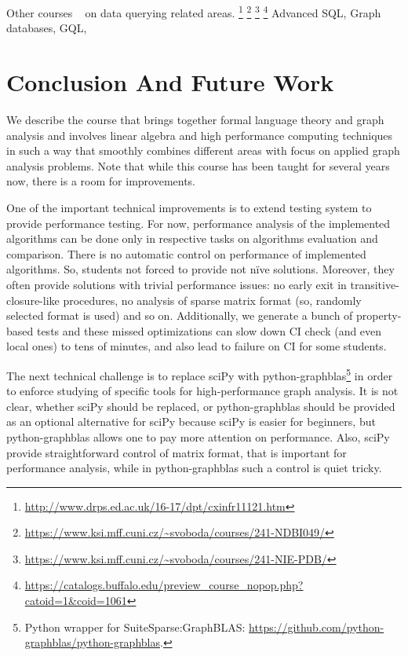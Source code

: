 \documentclass[sigconf]{acmart}
\begin{document}
Other courses ~\cite{Figueira2022} on data querying related areas.
\footnote{\url{http://www.drps.ed.ac.uk/16-17/dpt/cxinfr11121.htm}}
\footnote{\url{https://www.ksi.mff.cuni.cz/~svoboda/courses/241-NDBI049/}}
\footnote{\url{https://www.ksi.mff.cuni.cz/~svoboda/courses/241-NIE-PDB/}}
\footnote{\url{https://catalogs.buffalo.edu/preview_course_nopop.php?catoid=1&coid=1061}}
Advanced SQL, Graph databases, GQL, 

\section{Conclusion And Future Work}

We describe the course that brings together formal language theory and graph analysis and involves linear algebra and high performance computing techniques in such a way that smoothly combines different areas with focus on applied graph analysis problems. 
Note that while this course has been taught for several years now, there is a room for improvements.

One of the important technical improvements is to extend testing system to provide performance testing. 
For now, performance analysis of the implemented algorithms can be done only in respective tasks on algorithms evaluation and comparison.
There is no automatic control on performance of implemented algorithms. 
So, students not forced to provide not n\"ive solutions.
Moreover, they often provide solutions with trivial performance issues: no early exit in transitive-closure-like procedures, no analysis of sparse matrix format (so, randomly selected format is used) and so on.
Additionally, we generate a bunch of property-based tests and these missed optimizations can slow down CI check (and even local ones) to tens of minutes, and also lead to failure on CI for some students.

The next technical challenge is to replace sciPy with python-graphblas\footnote{Python wrapper for SuiteSparse:GraphBLAS: \url{https://github.com/python-graphblas/python-graphblas}.} in order to enforce studying of specific tools for high-performance graph analysis. 
It is not clear, whether sciPy should be replaced, or python-graphblas should be provided as an optional alternative for sciPy because sciPy is easier for beginners, but python-graphblas allows one to pay more attention on performance.
Also, sciPy provide straightforward control of matrix format, that is important for performance analysis, while in python-graphblas such a control is quiet tricky.
\end{document}

